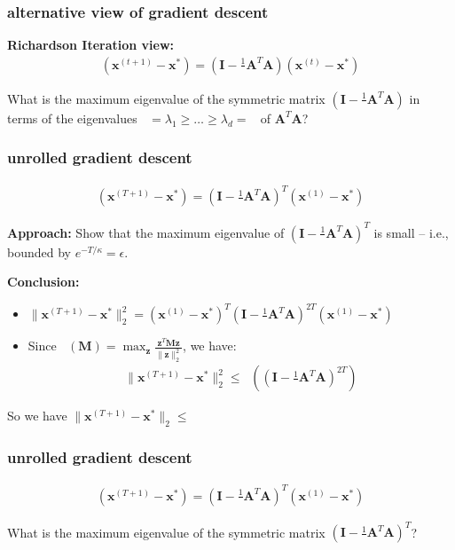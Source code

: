\documentclass[compress]{beamer}
\newcommand{\bv}[1]{\mathbf{#1}}
\DeclareMathOperator*{\lmin}{\lambda_{min}}
\DeclareMathOperator*{\lmax}{\lambda_{max}}
\begin{document}
\begin{frame}[t]
	\frametitle{alternative view of gradient descent}
	\textbf{Richardson Iteration view:}
	\begin{align*}
		(\bv{x}^{(t+1)} - \bv{x}^*) =  \left(\bv{I} - \frac{1}{\lmax}\bv{A}^T\bv{A}\right)(\bv{x}^{(t)} - \bv{x}^*) 
	\end{align*}
	
	
	\vspace{10em}
	What is the maximum eigenvalue of the symmetric matrix $\left(\bv{I} - \frac{1}{\lmax}\bv{A}^T\bv{A}\right)$ in terms of the eigenvalues $\lmax = \lambda_1 \geq \ldots \geq \lambda_d = \lmin$ of $\bv{A}^T\bv{A}$?
\end{frame}

\begin{frame}[t]
	\frametitle{unrolled gradient descent}
	\begin{align*}
		(\bv{x}^{(T+1)} - \bv{x}^*) =  \left(\bv{I} - \frac{1}{\lmax}\bv{A}^T\bv{A}\right)^T(\bv{x}^{(1)} - \bv{x}^*) 
	\end{align*}
	
	\textbf{Approach:} Show that the maximum eigenvalue of $\left(\bv{I} - \frac{1}{\lmax}\bv{A}^T\bv{A}\right)^T$ is small -- i.e., bounded by $e^{-T/\kappa} = \epsilon$. 
	
	\textbf{Conclusion:}
	\begin{itemize}
		\item $\|\bv{x}^{(T+1)} - \bv{x}^*\|_2^2 = (\bv{x}^{(1)} - \bv{x}^*)^T\left(\bv{I} - \frac{1}{\lmax}\bv{A}^T\bv{A}\right)^{2T}(\bv{x}^{(1)} - \bv{x}^*)$
		\item Since $\lmax(\bv{M}) = \max_{\bv{z}} \frac{\bv{z}^T\bv{M}\bv{z}}{\|\bv{z}\|_2^2}$, we have:
			\begin{align*}
				\|\bv{x}^{(T+1)} - \bv{x}^*\|_2^2 \leq \lmax\left(\left(\bv{I} - \frac{1}{\lmax}\bv{A}^T\bv{A}\right)^{2T}\right)
			\end{align*}
	\end{itemize}
	
	So we have $\|\bv{x}^{(T+1)} - \bv{x}^*\|_2 \leq $
\end{frame}

\begin{frame}[t]
	\frametitle{unrolled gradient descent}
	\begin{align*}
		(\bv{x}^{(T+1)} - \bv{x}^*) =  \left(\bv{I} - \frac{1}{\lmax}\bv{A}^T\bv{A}\right)^T(\bv{x}^{(1)} - \bv{x}^*) 
	\end{align*}
	
	\vspace{3em}
	What is the maximum eigenvalue of the symmetric matrix $\left(\bv{I} - \frac{1}{\lmax}\bv{A}^T\bv{A}\right)^T$?
	

\end{frame}
\end{document}
